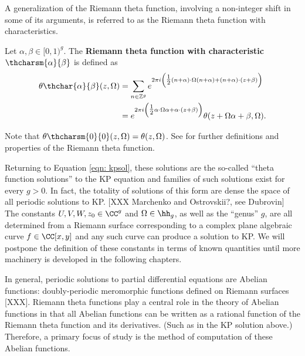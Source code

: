 A generalization of the Riemann theta function, involving a non-integer
shift in some of its arguments, is referred to as the Riemann theta
function with characteristics.

\begin{definition} \label{def: thetachar}
Let $\alpha,\beta \in [0,1)^{g}$. The {\bf Riemann theta function with
characteristic $\thcharsm{\alpha}{\beta}$} is defined as
\begin{align*}
  \theta\thchar{\alpha}{\beta}(z, \Omega) &=
  \sum_{n \in \mathbb{Z}^g}
  e^{2 \pi i \left( \tfrac{1}{2} (n+\alpha) \cdot \Omega (n+\alpha) +
    (n + \alpha) \cdot (z + \beta) \right) } \\
  &=
  e^{2\pi i \left( \tfrac{1}{2} \alpha \cdot \Omega \alpha +
    \alpha \cdot (z + \beta) \right)}
  \theta(z + \Omega \alpha + \beta, \Omega).
\end{align*}
\end{definition}

Note that $\theta \thcharsm{0}{0}(z,\Omega) = \theta(z,\Omega)$. See
\cite{DLMF,MumfordI07,MumfordII07} for further definitions and
properties of the Riemann theta function.

Returning to Equation \eqref{eqn: kpsol}, these solutions are the
so-called ``theta function solutions'' to the KP equation and families
of such solutions exist for every $g > 0$. In fact, the totality of
solutions of this form are dense the space of all periodic solutions to
KP. [XXX Marchenko and Ostrovskii?, see Dubrovin] The constants
$U,V,W,z_0 \in \CC^g$ and $\Omega \in \hh_g$, as well as the ``genus''
$g$, are all determined from a Riemann surface corresponding to a
complex plane algebraic curve $f \in \CC[x,y]$ and any such curve can
produce a solution to KP. \cite{Dubrovin81} We will postpone the
definition of these constants in terms of known quantities until more
machinery is developed in the following chapters.


In general, periodic solutions to partial differential equations are
Abelian functions: doubly-periodic meromorphic functions defined on
Riemann surfaces [XXX]. Riemann theta functions play a central role in
the theory of Abelian functions in that all Abelian functions can be
written as a rational function of the Riemann theta function and its
derivatives. (Such as in the KP solution above.) Therefore, a primary
focus of study is the method of computation of these Abelian functions.

